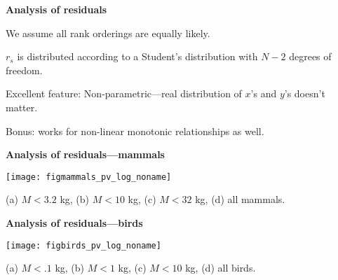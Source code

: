 {\inv

{\tiny {}}


\vis


  \textbf{Analysis of residuals}

We assume all rank orderings are equally likely.

$r_s$ is distributed according to a Student's distribution
with $N-2$ degrees of freedom.

Excellent feature: Non-parametric---real distribution
of $x$'s and $y$'s doesn't matter.

Bonus: works for non-linear monotonic relationships as well.

{\tiny {}}

\inv

\vis


  \textbf{Analysis of residuals---mammals}

  \vspace{5mm}
  \begin{center}
    \texttt{[image: figmammals\_pv\_log\_noname]}
  \end{center}
{\small (a) $M<3.2$ kg, (b) $M<10$ kg, (c) $M<32$ kg, (d) all mammals.}




  \textbf{Analysis of residuals---birds}

  \vspace{5mm}
  \begin{center}
    \texttt{[image: figbirds\_pv\_log\_noname]}
  \end{center}
{\small (a) $M<.1$ kg, (b) $M<1$ kg, (c) $M<10$ kg, (d) all birds.}



}
